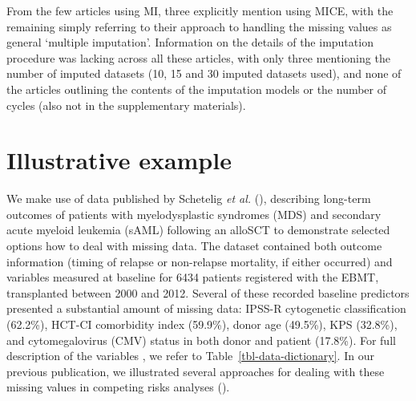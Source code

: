 \documentclass[
  letterpaper,
  DIV=11,
  numbers=noendperiod]{scrreprt}
\begin{document}
From the few articles using MI, three explicitly mention using MICE,
with the remaining simply referring to their approach to handling the
missing values as general `multiple imputation'. Information on the
details of the imputation procedure was lacking across all these
articles, with only three mentioning the number of imputed datasets (10,
15 and 30 imputed datasets used), and none of the articles outlining the
contents of the imputation models or the number of cycles (also not in
the supplementary materials).

\section{Illustrative example}\label{illustrative-example}

We make use of data published by Schetelig \emph{et al.}
(),
describing long-term outcomes of patients with myelodysplastic syndromes
(MDS) and secondary acute myeloid leukemia (sAML) following an alloSCT
to demonstrate selected options how to deal with missing data. The
dataset contained both outcome information (timing of relapse or
non-relapse mortality, if either occurred) and variables measured at
baseline for 6434 patients registered with the EBMT, transplanted
between 2000 and 2012. Several of these recorded baseline predictors
presented a substantial amount of missing data: IPSS-R cytogenetic
classification (62.2\%), HCT-CI comorbidity index (59.9\%), donor age
(49.5\%), KPS (32.8\%), and cytomegalovirus (CMV) status in both donor
and patient (17.8\%). For full description of the variables , we refer
to Table~\ref{tbl-data-dictionary}. In our previous publication, we
illustrated several approaches for dealing with these missing values in
competing risks analyses
().
\end{document}
